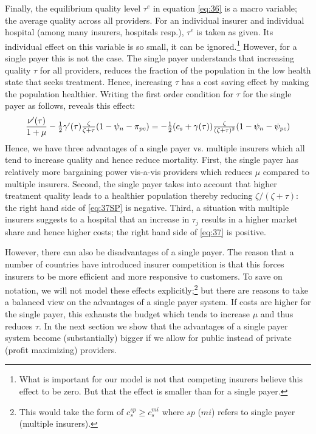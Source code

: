 \documentclass[a4paper,12pt]{article}
\begin{document}
Finally, the equilibrium quality level \(\tau^e\) in equation \eqref{eq:36} is a macro variable; the average quality across all providers. For an individual insurer and individual hospital (among many insurers, hospitals resp.), \(\tau^e\) is taken as given. Its individual effect on this variable is so small, it can be ignored.\footnote{What is important for our model is not that competing insurers believe this effect to be zero. But that the effect is smaller than for a single payer.} However, for a single payer this is not the case. The single payer understands that increasing quality \(\tau\) for all providers, reduces the fraction of the population in the low health state that seeks treatment. Hence, increasing \(\tau\) has a cost saving effect by making the population healthier. Writing the first order condition for \(\tau\) for the single payer as follows, reveals this effect:
\begin{equation}
\label{eq:37SP}
 \frac{\nu'(\tau)}{1+\mu} - \textstyle{1\over 2} \gamma'(\tau) \frac{\zeta}{\zeta+\tau}(1-\psi_n-\pi_{pc}) = - \textstyle{1\over 2}(c_s+\gamma( \tau)) \frac{\zeta}{(\zeta+\tau)^2} (1-\psi_n -\psi_{pc})  
\end{equation}
Hence, we have three advantages of a single payer vs. multiple insurers which all tend to increase quality and hence reduce mortality. First, the single payer has relatively more bargaining power vis-a-vis providers which reduces \(\mu\) compared to multiple insurers. Second, the single payer takes into account that higher treatment quality leads to a healthier population thereby reducing \(\zeta/(\zeta+\tau)\): the right hand side of \eqref{eq:37SP} is negative. Third, a situation with multiple insurers suggests to a hospital that an increase in \(\tau_j\) results in a higher market share and hence higher costs; the right hand side of \eqref{eq:37} is positive.

However, there can also be disadvantages of a single payer. The reason that a number of countries have introduced insurer competition is that this forces insurers to be more efficient and more responsive to customers. To save on notation, we will not model these effects explicitly;\footnote{This would take the form of \(c_s^{sp} \geq c_s^{mi}\) where \(sp\) (\(mi\)) refers to single payer (multiple insurers).} but there are reasons to take a balanced view on the advantages of a single payer system. If costs are higher for the single payer, this exhausts the budget which tends to increase \(\mu\) and thus reduces \(\tau\). In the next section we show that the advantages of a single payer system become (substantially) bigger if we allow for public instead of private (profit maximizing) providers.
\end{document}
